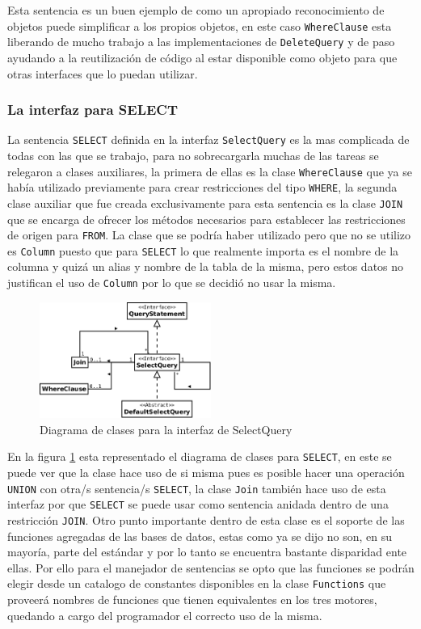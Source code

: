 Esta sentencia es un buen ejemplo de como un apropiado reconocimiento de objetos puede simplificar a los propios objetos, en este caso \verb=WhereClause= esta liberando de mucho trabajo a las implementaciones de \verb=DeleteQuery= y de paso ayudando a la reutilización de código al estar disponible como objeto para que otras interfaces que lo puedan utilizar.
%
\subsubsection{La interfaz para SELECT}
La sentencia \verb=SELECT= definida en la interfaz \verb=SelectQuery= es la mas complicada de todas con las que se trabajo, para no sobrecargarla muchas de las tareas se relegaron  a clases auxiliares, la primera de ellas es la clase \verb=WhereClause= que ya se había utilizado previamente para crear restricciones del tipo \verb=WHERE=, la segunda clase auxiliar que fue creada exclusivamente para esta sentencia es la clase \verb=JOIN= que se encarga de ofrecer los métodos necesarios para establecer las restricciones de origen para  \verb=FROM=. La clase que se podría haber utilizado pero que no se utilizo es \verb=Column= puesto que para \verb=SELECT= lo que realmente importa es el nombre de la columna y quizá un alias y nombre de la tabla de la misma, pero estos datos no justifican el uso de \verb=Column= por lo que se decidió no usar la misma.
%
\begin{figure}[h]
  \centering
    \includegraphics[width=0.5\textwidth]{figuras/jdbgm-dc-select.png}
  \caption{Diagrama de clases para la interfaz de SelectQuery}
  \label{fig:dc-selectquery}
\end{figure}

En la figura \ref{fig:dc-selectquery} esta representado el diagrama de clases para \verb=SELECT=, en este se puede ver que la clase hace uso de si misma pues es posible hacer una operación \verb=UNION= con otra/s sentencia/s \verb=SELECT=, la clase \verb=Join= también hace uso de esta interfaz por que \verb=SELECT= se puede usar como sentencia anidada dentro de una restricción \verb=JOIN=. Otro punto importante dentro de esta clase es el soporte de las funciones agregadas de las bases de datos, estas como ya se dijo no son, en su mayoría, parte del estándar y por lo tanto se encuentra bastante disparidad ente ellas. Por ello para el manejador de sentencias se opto que las funciones se podrán elegir desde un catalogo de constantes disponibles en la clase \verb=Functions= que proveerá nombres de funciones que tienen equivalentes en los tres motores, quedando a cargo del programador el correcto uso de la misma.
%
